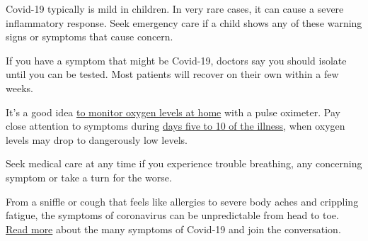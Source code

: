 Covid-19 typically is mild in children. In very rare cases, it can cause
a severe inflammatory response. Seek emergency care if a child shows any
of these warning signs or symptoms that cause concern.

If you have a symptom that might be Covid-19, doctors say you should
isolate until you can be tested. Most patients will recover on their own
within a few weeks.

It's a good idea
\href{https://www.nytimes3xbfgragh.onion/2020/04/24/well/live/coronavirus-pulse-oximeter-oxygen.html}{to
monitor oxygen levels at home} with a pulse oximeter. Pay close
attention to symptoms during
\href{https://www.nytimes3xbfgragh.onion/2020/04/30/well/live/coronavirus-days-5-through-10.html}{days
five to 10 of the illness}, when oxygen levels may drop to dangerously
low levels.

Seek medical care at any time if you experience trouble breathing, any
concerning symptom or take a turn for the worse.

From a sniffle or cough that feels like allergies to severe body aches
and crippling fatigue, the symptoms of coronavirus can be unpredictable
from head to toe.
\href{https://www.nytimes3xbfgragh.onion/2020/08/05/well/live/coronavirus-covid-symptoms.html}{Read
more} about the many symptoms of Covid-19 and join the conversation.

